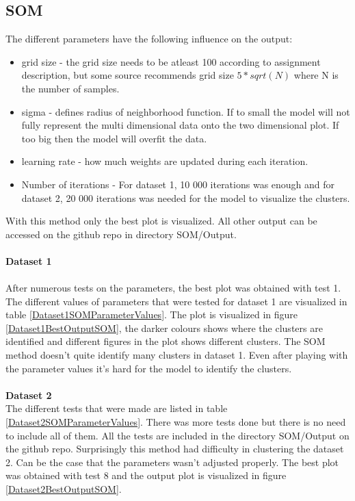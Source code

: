 \documentclass[12pt]{report}
\begin{document}
	\subsection{SOM}	
	The different parameters have the following influence on the output:
	\begin{itemize}
		\item grid size - the grid size needs to be atleast 100 according to assignment description, but some source recommends grid size $5*sqrt(N)$ where N is the number of samples.
		\item sigma - defines radius of neighborhood function. If to small the model will not fully represent the multi dimensional data onto the two dimensional plot. If too big then the model will overfit the data.
		\item learning rate - how much weights are updated during each iteration. 
		\item Number of iterations - For dataset 1, 10 000 iterations was enough and for dataset 2, 20 000 iterations was needed for the model to visualize the clusters.
	\end{itemize}
	With this method only the best plot is visualized. All other output can be accessed on the github repo in directory SOM/Output.\\
	\\
	\textbf{Dataset 1}\\
	\\
	After numerous tests on the parameters, the best plot was obtained with test 1. The different values of parameters that were tested for dataset 1 are visualized in table \ref{Dataset1SOMParameterValues}. The plot is visualized in figure \ref{Dataset1BestOutputSOM}, the darker colours shows where the clusters are identified and different figures in the plot shows different clusters. The SOM method doesn't quite identify many clusters in dataset 1. Even after playing with the parameter values it's hard for the model to identify the clusters.\\
	\\
	\textbf{Dataset 2}\\
	The different tests that were made are listed in table \ref{Dataset2SOMParameterValues}. There was more tests done but there is no need to include all of them. All the tests are included in the directory SOM/Output on the github repo. Surprisingly this method had difficulty in clustering the dataset 2. Can be the case that the parameters wasn't adjusted properly. The best plot was obtained with test 8 and the output plot is visualized in figure \ref{Dataset2BestOutputSOM}.
\end{document}
